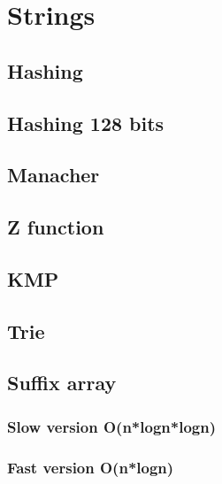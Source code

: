 \section{Strings}

\subsection{Hashing}


\subsection{Hashing 128 bits}


\subsection{Manacher}


\subsection{Z function}


\subsection{KMP}


\subsection{Trie}


\subsection{Suffix array}

\subsubsection{Slow version O(n*logn*logn)}


\subsubsection{Fast version O(n*logn)}


